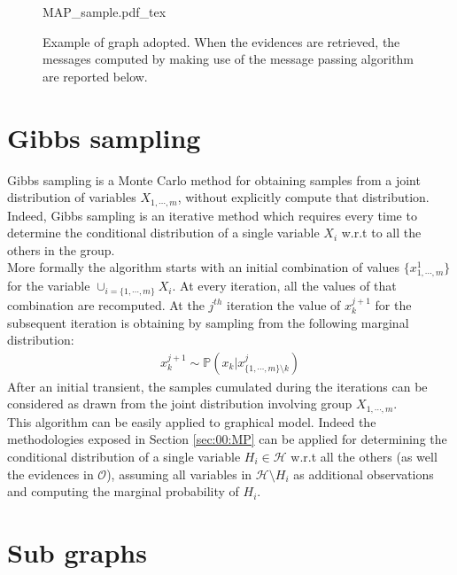 \begin{figure}
	\centering
\def\svgwidth{0.8 \textwidth}
{MAP_sample.pdf_tex}
	\caption{Example of graph adopted. When the evidences are retrieved, the messages computed by making use of the message passing algorithm are reported below.}
	\label{fig:00:MAP_sample}
\end{figure}  

\section{Gibbs sampling}
\label{sec:00:GIBBS}

Gibbs sampling is a Monte Carlo method for obtaining samples from a joint distribution of variables $X_{1,\cdots,m}$, without explicitly compute that distribution. Indeed, Gibbs sampling is an iterative method which requires every time to determine the conditional distribution of a single variable $X_i$ w.r.t to all the others in the group. 
\\
More formally the algorithm starts with an initial combination of values $\lbrace x^1_{1,\cdots,m} \rbrace$ for the variable 
$ \cup _{i = \lbrace 1,\cdots,m \rbrace } X_i$. At every iteration, all the values of that combination are recomputed. At the $j^{th}$ iteration the value of $x^{j+1} _k$ for the subsequent iteration is obtaining by sampling from the following marginal distribution:
\begin{eqnarray}
x^{j+1} _k \sim \mathbb{P}(x _{k} | x^j_{\lbrace 1, \cdots , m \rbrace \setminus k } )
\end{eqnarray}
After an initial transient, the samples cumulated during the iterations can be considered as drawn from the joint distribution involving group $X_{1,\cdots,m}$. 
\\ 
This algorithm can be easily applied to graphical model. Indeed the methodologies exposed in Section \ref{sec:00:MP} can be applied for determining the conditional distribution of a single variable $H_i \in \mathcal{H}$ w.r.t all the others (as well the evidences in $\mathcal{O}$), assuming all variables in $\mathcal{H} \setminus H_i$ as additional observations and computing the marginal probability of $H_i$.

\section{Sub graphs}
\label{sec:00:SUB_GRAPH}

